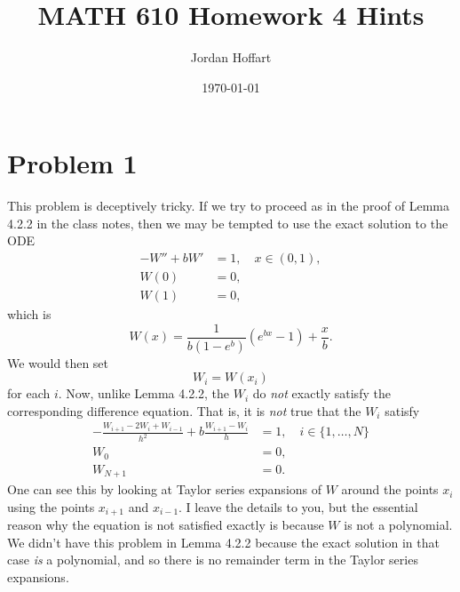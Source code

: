 \documentclass{article}
\title{MATH 610 Homework 4 Hints}
\author{Jordan Hoffart}
\date{\today}
\theoremstyle{definition}
\theoremstyle{plain}
\theoremstyle{remark}
\begin{document}
\maketitle

\section*{Problem 1}
This problem is deceptively tricky.
If we try to proceed as in the proof of Lemma 4.2.2 in the class notes, then we may be tempted to use the exact solution to the ODE
\begin{align*}
	-W'' + bW' & = 1, \quad x \in (0,1), \\
	W(0)       & = 0,                    \\
	W(1)       & = 0,
\end{align*}
which is
\[W(x) = \frac{1}{b(1-e^b)}(e^{bx}-1) + \frac{x}{b}.\]
We would then set
\[W_i = W(x_i)\]
for each $i$.
Now, unlike Lemma 4.2.2, the $W_i$ do \emph{not} exactly satisfy the corresponding difference equation.
That is, it is \emph{not} true that the $W_i$ satisfy
\begin{subequations}\label{sys:difference}
	\begin{align}
		-\frac{W_{i+1}-2W_i+W_{i-1}}{h^2} + b\frac{W_{i+1}-W_i}{h} & = 1, \quad i \in \{1,\dots,N\} \\
		W_0                                                        & = 0,                           \\
		W_{N+1}                                                    & = 0.
	\end{align}
\end{subequations}
One can see this by looking at Taylor series expansions of $W$ around the points $x_i$ using the points $x_{i+1}$ and $x_{i-1}$.
I leave the details to you, but the essential reason why the equation is not satisfied exactly is because $W$ is not a polynomial.
We didn't have this problem in Lemma 4.2.2 because the exact solution in that case \emph{is} a polynomial, and so there is no remainder term in the Taylor series expansions.
\end{document}

